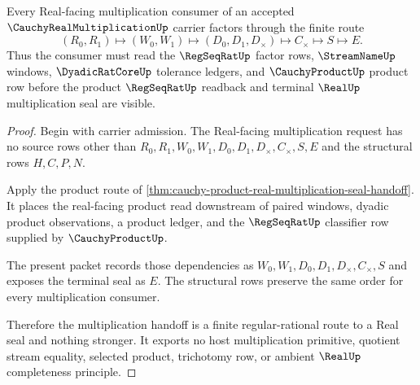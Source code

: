 \begin{theorem}
\label{thm:cauchy-real-multiplication-regseqrat-handoff}
Every Real-facing multiplication consumer of an accepted $\CauchyRealMultiplicationUp$ carrier factors through the finite route
$$
(R_0,R_1)\longmapsto(W_0,W_1)\longmapsto(D_0,D_1,D_\times)\longmapsto C_\times\longmapsto S\longmapsto E .
$$
Thus the consumer must read the $\RegSeqRatUp$ factor rows, $\StreamNameUp$ windows, $\DyadicRatCoreUp$ tolerance ledgers, and $\CauchyProductUp$ product row before the product $\RegSeqRatUp$ readback and terminal $\RealUp$ multiplication seal are visible.
\end{theorem}
\begin{proof}
Begin with carrier admission. The Real-facing multiplication request has no source rows other than $R_0,R_1,W_0,W_1,D_0,D_1,D_\times,C_\times,S,E$ and the structural rows $H,C,P,N$.

Apply the product route of \autoref{thm:cauchy-product-real-multiplication-seal-handoff}. It places the real-facing product read downstream of paired windows, dyadic product observations, a product ledger, and the $\RegSeqRatUp$ classifier row supplied by $\CauchyProductUp$.

The present packet records those dependencies as $W_0,W_1,D_0,D_1,D_\times,C_\times,S$ and exposes the terminal seal as $E$. The structural rows preserve the same order for every multiplication consumer.

Therefore the multiplication handoff is a finite regular-rational route to a Real seal and nothing stronger. It exports no host multiplication primitive, quotient stream equality, selected product, trichotomy row, or ambient $\RealUp$ completeness principle.
\end{proof}


